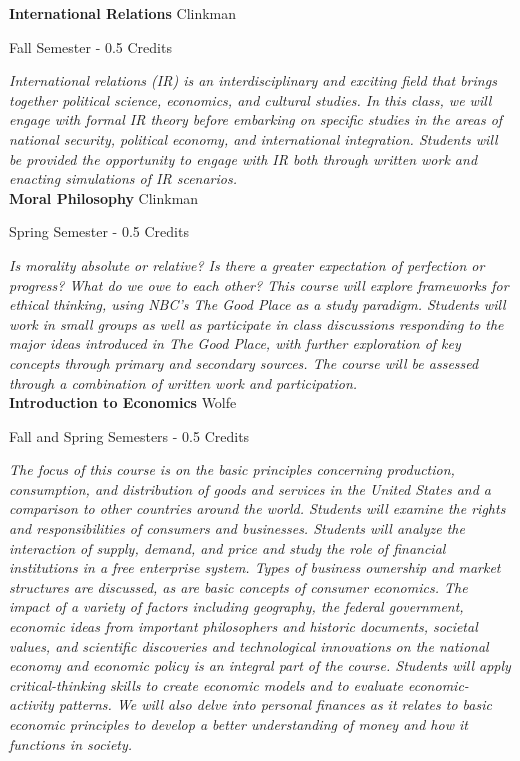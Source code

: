 \noindent\textbf{International Relations} \hfill Clinkman

\noindent Fall Semester - 0.5 Credits

\vspace{1mm}\emph{International relations (IR) is an interdisciplinary and exciting field that brings together political science, economics, and cultural studies. In this class, we will engage with formal IR theory before embarking on specific studies in the areas of national security, political economy, and international integration. Students will be provided the opportunity to engage with IR both through written work and enacting simulations of IR scenarios.}\\

\noindent\textbf{Moral Philosophy} \hfill Clinkman

\noindent Spring Semester - 0.5 Credits

\vspace{1mm}\emph{Is morality absolute or relative? Is there a greater expectation of perfection or progress? What do we owe to each other? This course will explore frameworks for ethical thinking, using NBC’s The Good Place as a study paradigm. Students will work in small groups as well as participate in class discussions responding to the major ideas introduced in The Good Place, with further exploration of key concepts through primary and secondary sources. The course will be assessed through a combination of written work and participation.}\\

\noindent\textbf{Introduction to Economics} \hfill Wolfe

\noindent Fall and Spring Semesters - 0.5 Credits

\vspace{1mm}\emph{The focus of this course is on the basic principles concerning production, consumption, and distribution of goods and services in the United States and a comparison to other countries around the world. Students will examine the rights and responsibilities of consumers and businesses. Students will analyze the interaction of supply, demand, and price and study the role of financial institutions in a free enterprise system. Types of business ownership and market structures are discussed, as are basic concepts of consumer economics. The impact of a variety of factors including geography, the federal government, economic ideas from important philosophers and historic documents, societal values, and scientific discoveries and technological innovations on the national economy and economic policy is an integral part of the course. Students will apply critical-thinking skills to create economic models and to evaluate economic-activity patterns. We will also delve into personal finances as it relates to basic economic principles to develop a better understanding of money and how it functions in society.}\\

